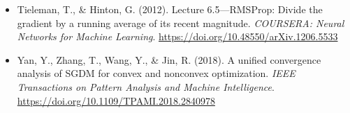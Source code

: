 \documentclass[a5paper]{article}
\begin{document}
\begin{itemize}
		\item Tieleman, T., \& Hinton, G. (2012). Lecture 6.5—RMSProp: Divide the gradient by a running average of its recent magnitude. \textit{COURSERA: Neural Networks for Machine Learning}. \url{https://doi.org/10.48550/arXiv.1206.5533}
		\item Yan, Y., Zhang, T., Wang, Y., \& Jin, R. (2018). A unified convergence analysis of SGDM for convex and nonconvex optimization. \textit{IEEE Transactions on Pattern Analysis and Machine Intelligence}. \url{https://doi.org/10.1109/TPAMI.2018.2840978}
	\end{itemize}
	
	
\end{document}
